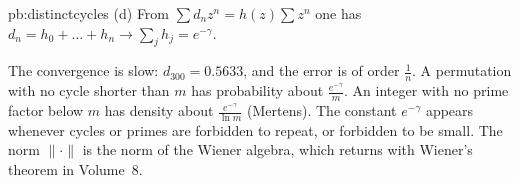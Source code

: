 \begin{solution}{pb:distinctcycles}
(d) From $\sum d_nz^n=h(z)\sum z^n$ one has $d_n=h_0+\dots+h_n\to\sum_jh_j=e^{-\gamma}$.

\leads The convergence is slow: $d_{300}=0.5633$, and the error is of order $\frac1n$. A permutation with no cycle shorter than $m$ has probability
about $\frac{e^{-\gamma}}m$. An integer with no prime factor below $m$ has density about $\frac{e^{-\gamma}}{\ln m}$ (Mertens). The constant $e^{-\gamma}$ appears whenever
cycles or primes are forbidden to repeat, or forbidden to be small. The norm $\|\cdot\|$ is the norm of the Wiener algebra, which returns with Wiener's theorem in Volume~8.
\end{solution}

